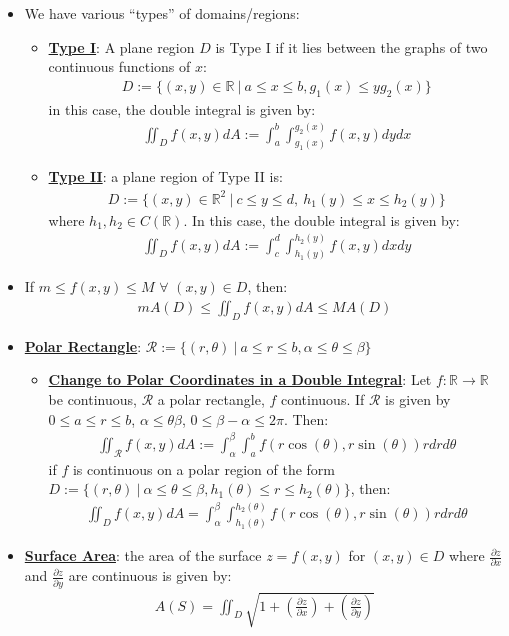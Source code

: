 \documentclass[reqno,11pt]{amsart}
\theoremstyle{definition}
\theoremstyle{remark}
\newcommand{\R}{\mathbb{R}}
\newcommand{\dfn}[1]{\underline{\textbf{#1}}}
\begin{document}
\begin{itemize}
	 \item We have various ``types'' of domains/regions: 
	 \begin{itemize}
	 	\item \dfn{Type I}: A plane region $D$ is Type I if it lies between the graphs of two continuous functions of $x$: 
	 	\begin{align}
	 		D := \{ (x,y) \in \R\ |\ a \leq x \leq b, g_1(x) \leq y g_2(x) \} 	
	 	\end{align}
		in this case, the double integral is given by: 
		\begin{align}
			\iint_D f(x,y) dA := \int_a^b \int_{g_1(x)}^{g_2(x)} f(x,y) dy dx 	
		\end{align}
		\item \dfn{Type II}: a plane region of Type II is: 
		\begin{align}
			D := \{ (x,y) \in \R^2\ |\ c \leq y \leq d,\ h_1(y) \leq x \leq h_2(y) \}	
		\end{align}
		where $h_1, h_2 \in C(\R)$. In this case, the double integral is given by: 
		\begin{align*}
			\iint_D f(x,y) dA := \int_c^d \int_{h_1(y)}^{h_2(y)} f(x,y) dx dy
		\end{align*}
	 \end{itemize}
	 \item If $m \leq f(x,y) \leq M$ $\forall$ $(x,y) \in D$, then: 
	 \begin{align}
	 	mA(D) \leq \iint_D f(x,y) dA \leq M A(D) 	
	 \end{align}
	\item \dfn{Polar Rectangle}: $\mathcal{R} := \{ (r, \theta)\ |\ a \leq r \leq b, \alpha \leq \theta \leq \beta \}$ 
	\begin{itemize}
		\item \dfn{Change to Polar Coordinates in a Double Integral}: Let $f: \R \rightarrow \R$ be continuous, $\mathcal{R}$ a polar rectangle, $f$ continuous. If $\mathcal{R}$ is given by $0 \leq a \leq r \leq b$, $\alpha \leq \theta \beta$, $0 \leq \beta - \alpha \leq 2 \pi $. Then: 
		\begin{align}
			\iint_{\mathcal{R}} f(x,y) dA := \int_\alpha^\beta \int_a^b f ( r \cos (\theta), r \sin (\theta)) r dr d \theta 	
		\end{align}
		if $f$ is continuous on a polar region of the form $D := \{ (r, \theta)\ |\ \alpha \leq \theta \leq \beta, h_1(\theta) \leq r \leq h_2(\theta) \}$, then: 
		\begin{align}
			\iint_D f(x,y) dA = \int_{\alpha}^{\beta} \int_{h_1(\theta)}^{h_2(\theta)} f(r \cos (\theta), r \sin (\theta) ) r dr d \theta 	
		\end{align}
	\end{itemize}
	\item \dfn{Surface Area}: the area of the surface $z = f(x,y)$ for $(x,y) \in D $ where $\frac{\partial z}{\partial x}$ and $\frac{\partial z}{\partial y}$ are continuous is given by: 
	\begin{align}
		A(S) = \iint_D \sqrt{1 +  \left( \frac{\partial z}{\partial x} \right)  + \left( \frac{\partial z}{\partial y} \right) }	
	\end{align}	
\end{itemize}
\end{document}
